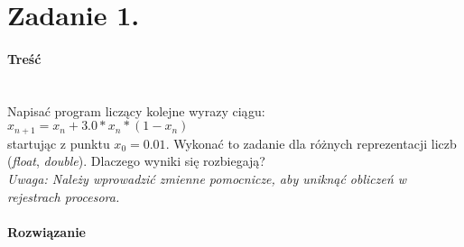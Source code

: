\section*{Zadanie 1.} \label{sec:Zadanie1}

\paragraph{Treść} ~\\
Napisać program liczący kolejne wyrazy ciągu: \\
$ x_{n+1} = x_{n} + 3.0 * x_{n} * (1 - x_{n}) $ \\
startując z punktu $ x_{0} = 0.01 $.
Wykonać to zadanie dla różnych reprezentacji liczb (\textit{float}, \textit{double}).
Dlaczego wyniki się rozbiegają? \\
\textit{Uwaga: Należy wprowadzić zmienne pomocnicze, aby uniknąć obliczeń w rejestrach procesora.} \\

\paragraph{Rozwiązanie} ~\\
 ~\\


